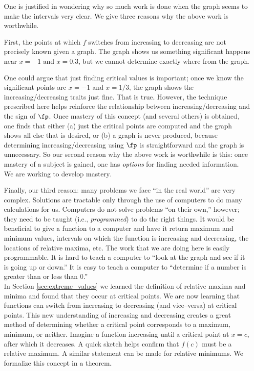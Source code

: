 One is justified in wondering why so much work is done when the graph seems to make the intervals very clear. We give three reasons why the above work is worthwhile.

First, the points at which $f$ switches from increasing to decreasing are not precisely known given a graph. The graph shows us something significant happens near $x=-1$ and $x=0.3$, but we cannot determine exactly where from the graph. 

One could argue that just finding critical values is important; once we know the significant points are $x=-1$ and $x=1/3$, the graph shows the increasing/decreasing traits just fine. That is true. However, the technique prescribed here helps reinforce the relationship between increasing/decreasing and the sign of $\fp$. Once mastery of this concept (and several others) is obtained, one finds that either (a) just the critical points are computed and the graph shows all else that is desired, or (b) a graph is never produced, because determining increasing/decreasing using $\fp$ is straightforward and the graph is unnecessary. 
So our second reason why the above work is worthwhile is this: once mastery of a subject is gained, one has \textit{options} for finding needed information. We are working to develop mastery.

Finally, our third reason: many problems we face ``in the real world'' are very complex. Solutions are tractable only through the use of computers to do many calculations for us. Computers do not solve problems ``on their own,'' however; they need to be taught (i.e., \textit{programmed}) to do the right things. It would be beneficial to give a function to a computer and have it return maximum and minimum values, intervals on which the function is increasing and decreasing, the locations of relative maxima, etc. The work that we are doing here is easily programmable. It is hard to teach a computer to ``look at the graph and see if it is going up or down.'' It is easy to teach a computer to ``determine if a number is greater than or less than 0.''\\

\enlargethispage{2\baselineskip}
In Section \ref{sec:extreme_values} we learned the definition of relative maxima and minima and found that they occur at critical points. We are now learning that functions can switch from increasing to decreasing (and vice--versa) at critical points. This new understanding of increasing and decreasing creates a great method of determining whether a critical point corresponds to a maximum, minimum, or neither. Imagine a function increasing until a critical point at $x=c$, after which it decreases. A quick sketch helps confirm that $f(c)$ must be a relative maximum. A similar statement can be made for relative minimums. We formalize this concept in a theorem.

